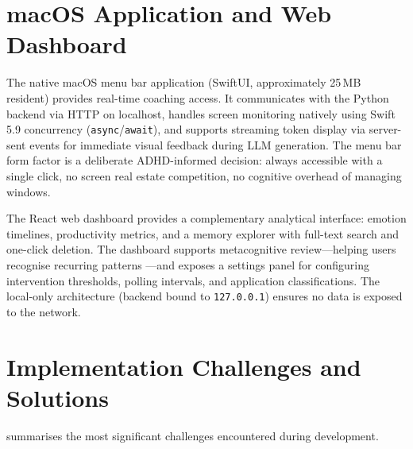 \section{macOS Application and Web Dashboard}
\label{sec:client-applications}

The native macOS menu bar application (SwiftUI, approximately 25\,MB resident) provides real-time coaching access. It communicates with the Python backend via HTTP on localhost, handles screen monitoring natively using Swift 5.9 concurrency (\texttt{async}/\texttt{await}), and supports streaming token display via server-sent events for immediate visual feedback during LLM generation. The menu bar form factor is a deliberate ADHD-informed decision: always accessible with a single click, no screen real estate competition, no cognitive overhead of managing windows.

The React web dashboard provides a complementary analytical interface: emotion timelines, productivity metrics, and a memory explorer with full-text search and one-click deletion. The dashboard supports metacognitive review---helping users recognise recurring patterns \cite{diamond2013}---and exposes a settings panel for configuring intervention thresholds, polling intervals, and application classifications. The local-only architecture (backend bound to \texttt{127.0.0.1}) ensures no data is exposed to the network.

\section{Implementation Challenges and Solutions}
\label{sec:implementation-challenges}

 summarises the most significant challenges encountered during development.

